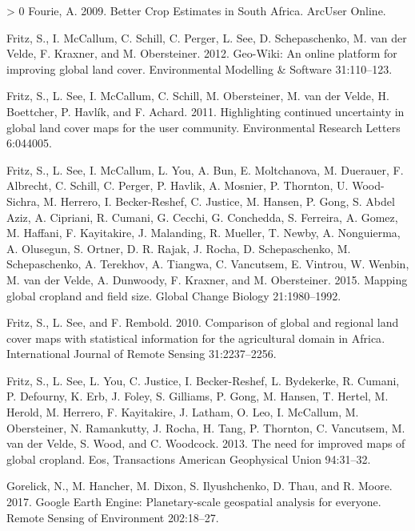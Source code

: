 \documentclass[11pt,a4paper]{article}
\newlength{\cslhangindent}
\newenvironment{CSLReferences}[3] %
 {%
  \setlength{\parindent}{0pt}
  \ifodd #1 \everypar{\setlength{\hangindent}{\cslhangindent}}\ignorespaces\fi
  \ifnum #2 > 0
  \setlength{\parskip}{#2\baselineskip}
  \fi
 }%
 {}
\begin{document}
\begin{CSLReferences}{1}{0}
\leavevmode\hypertarget{ref-FourieBetterCropEstimates2009}{}%
Fourie, A. 2009. Better {Crop Estimates} in {South Africa}. ArcUser
Online.

\leavevmode\hypertarget{ref-FritzGeoWikionlineplatform2012}{}%
Fritz, S., I. McCallum, C. Schill, C. Perger, L. See, D. Schepaschenko,
M. van der Velde, F. Kraxner, and M. Obersteiner. 2012. Geo-{Wiki}: {An}
online platform for improving global land cover. Environmental Modelling
\& Software 31:110--123.

\leavevmode\hypertarget{ref-FritzHighlightingcontinueduncertainty2011}{}%
Fritz, S., L. See, I. McCallum, C. Schill, M. Obersteiner, M. van der
Velde, H. Boettcher, P. Havlík, and F. Achard. 2011. Highlighting
continued uncertainty in global land cover maps for the user community.
Environmental Research Letters 6:044005.

\leavevmode\hypertarget{ref-FritzMappingglobalcropland2015}{}%
Fritz, S., L. See, I. McCallum, L. You, A. Bun, E. Moltchanova, M.
Duerauer, F. Albrecht, C. Schill, C. Perger, P. Havlik, A. Mosnier, P.
Thornton, U. Wood-Sichra, M. Herrero, I. Becker-Reshef, C. Justice, M.
Hansen, P. Gong, S. Abdel Aziz, A. Cipriani, R. Cumani, G. Cecchi, G.
Conchedda, S. Ferreira, A. Gomez, M. Haffani, F. Kayitakire, J.
Malanding, R. Mueller, T. Newby, A. Nonguierma, A. Olusegun, S. Ortner,
D. R. Rajak, J. Rocha, D. Schepaschenko, M. Schepaschenko, A. Terekhov,
A. Tiangwa, C. Vancutsem, E. Vintrou, W. Wenbin, M. van der Velde, A.
Dunwoody, F. Kraxner, and M. Obersteiner. 2015. Mapping global cropland
and field size. Global Change Biology 21:1980--1992.

\leavevmode\hypertarget{ref-FritzComparisonglobalregional2010}{}%
Fritz, S., L. See, and F. Rembold. 2010. Comparison of global and
regional land cover maps with statistical information for the
agricultural domain in {Africa}. International Journal of Remote Sensing
31:2237--2256.

\leavevmode\hypertarget{ref-Fritzneedimprovedmaps2013}{}%
Fritz, S., L. See, L. You, C. Justice, I. Becker-Reshef, L. Bydekerke,
R. Cumani, P. Defourny, K. Erb, J. Foley, S. Gilliams, P. Gong, M.
Hansen, T. Hertel, M. Herold, M. Herrero, F. Kayitakire, J. Latham, O.
Leo, I. McCallum, M. Obersteiner, N. Ramankutty, J. Rocha, H. Tang, P.
Thornton, C. Vancutsem, M. van der Velde, S. Wood, and C. Woodcock.
2013. The need for improved maps of global cropland. Eos, Transactions
American Geophysical Union 94:31--32.

\leavevmode\hypertarget{ref-GorelickGoogleEarthEngine2017}{}%
Gorelick, N., M. Hancher, M. Dixon, S. Ilyushchenko, D. Thau, and R.
Moore. 2017. Google {Earth Engine}: {Planetary}-scale geospatial
analysis for everyone. Remote Sensing of Environment 202:18--27.


\end{CSLReferences}
\end{document}
